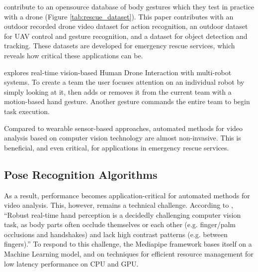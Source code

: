  

\cite{liu_szirányi_2021} \hspace*{0.3cm} \textit{}
\hspace*{0.5cm} contribute to an opensource database of body gestures which they test in practice with a drone (Figure  \ref{tab:rescue_dataset}). This paper contributes with an outdoor recorded drone video dataset for action recognition, an outdoor dataset for UAV control and gesture recognition, and a dataset for object detection and tracking. These datasets are developed for emergency rescue services, which reveals how critical these applications can be.

\cite{gesture_interface} \hspace*{0.3cm} \textit{}
\hspace*{0.5cm} explores real-time vision-based Human Drone Interaction with multi-robot systems. To create a team the user focuses attention on an individual robot by simply looking at it, then adds or removes it from the current team with a motion-based hand gesture. Another gesture commands the entire team to begin task execution. 

Compared to wearable sensor-based approaches, automated methods for video analysis based on computer vision technology are almost non-invasive. This is beneficial, and even critical, for applications in emergency rescue services. 

\subsection{Pose Recognition Algorithms}
As a result, performance becomes application-critical for automated methods for video analysis. This, however, remains a technical challenge. According to \cite{48292},  “Robust real-time hand perception is a decidedly challenging computer vision task, as body parts often occlude themselves or each other (e.g. finger/palm occlusions and handshakes) and lack high contrast patterns (e.g. between fingers).” To respond to this challenge, the Mediapipe framework \cite{48292} bases itself on a Machine Learning model, and on techniques for efficient resource management for low latency performance on CPU and GPU. 


